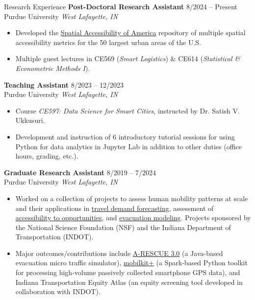 \documentclass{CV} %
\begin{document}
\begin{rSection}{Research Experience}
    {\bf Post-Doctoral Research Assistant} \hfill {8/2024 – Present}
    \\ Purdue University \hfill {\em West Lafayette, IN}
    \begin{itemize}[noitemsep]
        \item Developed the \href{https://github.com/rvanxer/spr_4711}{Spatial Accessibility of America} repository of multiple spatial accessibility metrics for the 50 largest urban areas of the U.S.
        \item Multiple guest lectures in CE569 ({\em Smart Logistics}) \& CE614 ({\em Statistical \& Econometric Methods I}).
    \end{itemize}
    
    {\bf Teaching Assistant} \hfill {8/2023 – 12/2023}
    \\ Purdue University \hfill {\em West Lafayette, IN}
    \begin{itemize}[noitemsep]
        \item Course {\em CE597: Data Science for Smart Cities}, instructed by Dr. Satish V. Ukkusuri.
        \item Development and instruction of 6 introductory tutorial sessions for using Python for data analytics in Jupyter Lab in addition to other duties (office hours, grading, etc.).
    \end{itemize}
    
    {\bf Graduate Research Assistant} \hfill {8/2019 – 7/2024}
    \\ Purdue University \hfill {\em West Lafayette, IN}
    \begin{itemize}[noitemsep]
        \item Worked on a collection of projects to assess human mobility patterns at scale and their applications in \href{https://doi.org/10.5703/1288284317685}{travel demand forecasting}, assessment of \href{https://rip.trb.org/View/2057911}{accessibility to opportunities}, and  \href{https://www.nsf.gov/awardsearch/showAward?AWD_ID=1520338}{evacuation modeling}. Projects sponsored by the National Science Foundation (NSF) and the Indiana Department of Transportation (INDOT).
        \item Major outcomes/contributions include \href{https://umnilab.github.io/HSEES_doc/}{A-RESCUE 3.0} (a Java-based evacuation micro traffic simulator), \href{https://github.com/rvanxer/mk}{mobilkit+} (a Spark-based Python toolkit for processing high-volume passively collected smartphone GPS data), and Indiana Transportation Equity Atlas (an equity screening tool developed in collaboration with INDOT).
    \end{itemize}
    

\end{rSection}
\end{document}
